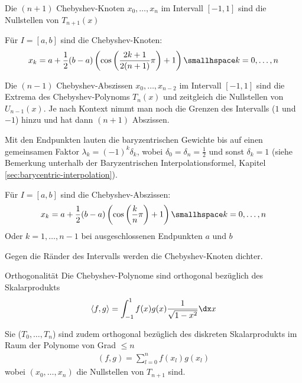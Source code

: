  Die $(n + 1)$ Chebyshev-Knoten $x_0, \ldots, x_n$ im Intervall $[-1, 1]$ sind die Nullstellen von $T_{n + 1}(x)$

 Für $I = [a, b]$ sind die Chebyshev-Knoten:
\rmvspace
\begin{align*}
	x_k = a + \frac{1}{2} (b - a) \left( \cos \left( \frac{2k + 1}{2(n + 1)} \pi \right) + 1 \right) \smallhspace k = 0, \ldots, n
\end{align*}

 Die $(n - 1)$ Chebyshev-Abszissen $x_0, \ldots, x_{n - 2}$ im Intervall $[-1, 1]$ sind die Extrema des Chebyshev-Polynoms $T_n(x)$ und zeitgleich die Nullstellen von $U_{n - 1}(x)$.
Je nach Kontext nimmt man noch die Grenzen des Intervalls ($1$ und $-1$) hinzu und hat dann $(n + 1)$ Abszissen.

Mit den Endpunkten lauten die baryzentrischen Gewichte bis auf einen gemeinsamen Faktor $\lambda_k = (-1)^k\delta_k$, wobei $\delta_0=\delta_n=\frac12$ und sonst $\delta_k=1$ (siehe Bemerkung unterhalb der Baryzentrischen Interpolationsformel, Kapitel \ref{sec:barycentric-interpolation}).

 Für $I = [a, b]$ sind die Chebyshev-Abszissen:
\rmvspace
\begin{align*}
	x_k = a + \frac{1}{2} (b - a) \left( \cos \left( \frac{k}{n} \pi \right) + 1 \right) \smallhspace k = 0, \ldots, n
\end{align*}
Oder $k = 1, \ldots, n - 1$ bei ausgeschlossenen Endpunkten $a$ und $b$

\inlineremark Gegen die Ränder des Intervalls werden die Chebyshev-Knoten dichter.

\begin{theorem}[]{Orthogonalität}
	Die Chebyshev-Polynome sind orthogonal bezüglich des Skalarprodukts
	\rmvspace
	\begin{align*}
		\langle f, g \rangle = \int_{-1}^{1} f(x) g(x) \frac{1}{\sqrt{1 - x^2}} \dx x
	\end{align*}

	Sie ($T_0, \ldots, T_n$) sind zudem orthogonal bezüglich des diskreten Skalarprodukts im Raum der Polynome von Grad $\leq n$
	\rmvspace
	\begin{align*}
		(f, g) = \sum_{l = 0}^{n} f(x_l)g(x_l)
	\end{align*}
	wobei $(x_0, \ldots, x_n)$ die Nullstellen von $T_{n + 1}$ sind.
\end{theorem}



